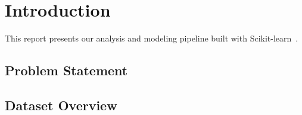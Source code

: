 \section{Introduction}
\label{sec:introduction}

This report presents our analysis and modeling pipeline built with Scikit-learn~\cite{pedregosa2011scikit}.

\subsection{Problem Statement}
\label{subsec:problem_statement}


\subsection{Dataset Overview}
\label{subsec:dataset_overview}


